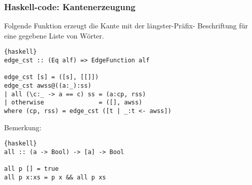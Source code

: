 \documentclass{beamer}
\begin{document}

\begin{frame}[fragile]
\frametitle{Haskell-code: Kantenerzeugung}
Folgende Funktion erzeugt die Kante mit der längster-Präfix- Beschriftung für eine gegebene Liste von Wörter.
\begin{lstlisting}{haskell}
edge_cst :: (Eq alf) => EdgeFunction alf

edge_cst [s] = ([s], [[]])
edge_cst awss@((a:_):ss) 
| all (\c:_ -> a == c) ss = (a:cp, rss)
| otherwise               = ([], awss)
where (cp, rss) = edge_cst ([t | _:t <- awss])
\end{lstlisting}
\bigskip
Bemerkung:
\begin{lstlisting}{haskell}
all :: (a -> Bool) -> [a] -> Bool

all p [] = true
all p x:xs = p x && all p xs
\end{lstlisting} 
\end{frame}
\end{document}

